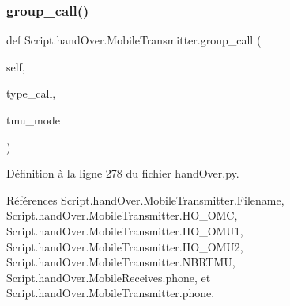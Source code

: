 \mbox{\label{classScript_1_1handOver_1_1MobileTransmitter_aa94147ba15169a9f22363e2bab2e5cd9}} 
\subsubsection{\texorpdfstring{group\+\_\+call()}{group\_call()}}
{\footnotesize\ttfamily def Script.\+hand\+Over.\+Mobile\+Transmitter.\+group\+\_\+call (\begin{DoxyParamCaption}\item[{}]{self,  }\item[{}]{type\+\_\+call,  }\item[{}]{tmu\+\_\+mode }\end{DoxyParamCaption})}



Définition à la ligne 278 du fichier hand\+Over.\+py.



Références Script.\+hand\+Over.\+Mobile\+Transmitter.\+Filename, Script.\+hand\+Over.\+Mobile\+Transmitter.\+H\+O\+\_\+\+O\+MC, Script.\+hand\+Over.\+Mobile\+Transmitter.\+H\+O\+\_\+\+O\+M\+U1, Script.\+hand\+Over.\+Mobile\+Transmitter.\+H\+O\+\_\+\+O\+M\+U2, Script.\+hand\+Over.\+Mobile\+Transmitter.\+N\+B\+R\+T\+MU, Script.\+hand\+Over.\+Mobile\+Receives.\+phone, et Script.\+hand\+Over.\+Mobile\+Transmitter.\+phone.


